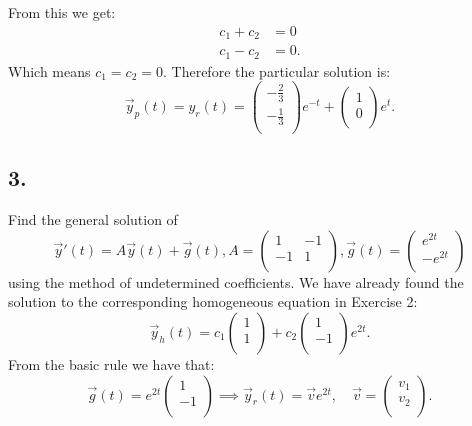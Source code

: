 From this we get:
\begin{align*}
  c_1 + c_2 &= 0 \\
  c_1 - c_2 &= 0
.\end{align*}
Which means $c_1 = c_2 = 0$. Therefore the particular solution is:
\[ 
\Vec{y}_p(t) = y_r(t) = \begin{pmatrix}
-\frac{2}{3}\\
-\frac{1}{3}\\
\end{pmatrix} e^{-t} + \begin{pmatrix}
1\\
0\\
\end{pmatrix}e^{t}
.\]



\subsection*{3.} Find the general solution of
\[ 
\Vec{y}'(t) = A \Vec{y}(t) + \Vec{g}(t), A = \begin{pmatrix}
1 & -1\\
-1 & 1\\
\end{pmatrix}, \Vec{g}(t) = \begin{pmatrix}
 e^{2t}\\
- e^{2t}\\
\end{pmatrix}
\]
using the method of undetermined coefficients.
\bigbreak
We have already found the solution to the corresponding homogeneous equation in Exercise 2:
\[ 
\Vec{y}_h(t) = c_1 \begin{pmatrix}
1\\
1\\
\end{pmatrix} + c_2 \begin{pmatrix}
1\\
-1\\
\end{pmatrix} e^{2t}
.\]
From the basic rule we have that:
\[ 
\Vec{g}(t) = e^{2t} \begin{pmatrix}
1\\
-1\\
\end{pmatrix} \implies \Vec{y}_r(t) = \Vec{v}e^{2t}, \quad \Vec{v} = \begin{pmatrix}
v_1\\
v_2\\
\end{pmatrix}
.\]
